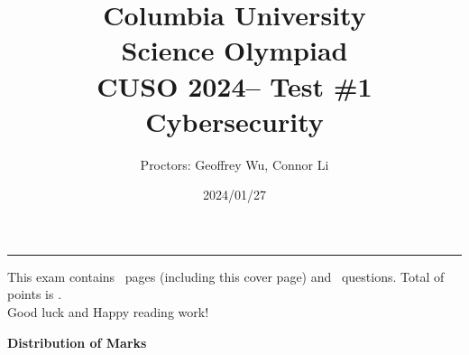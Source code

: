 \documentclass[letterpaper,12pt,addpoints]{exam}
\newcommand{\university}{Columbia University}
\newcommand{\faculty}{Science Olympiad}
\newcommand{\class}{CUSO 2024}
\newcommand{\examnum}{Test \#1}
\newcommand{\content}{Cybersecurity}
\newcommand{\examdate}{2024/01/27}
\begin{document}
\title{\Large \textbf{\university\\ \faculty\\
\bigskip
\class -- \examnum \\ \content}}
\author{Proctors: Geoffrey Wu, Connor Li}
\date{\examdate}
\maketitle
\begin{flushleft}
\medskip
{}
\end{flushleft}
\noindent \rule{\textwidth}{1pt}

\noindent This exam contains \numpages\ pages (including this cover page) and \numquestions\ questions. Total of points is \numpoints.\\
Good luck and Happy reading work!

\begin{center}
\textbf{Distribution of Marks}\\

\gradetable[v][questions]
\end{center}
\end{document}

